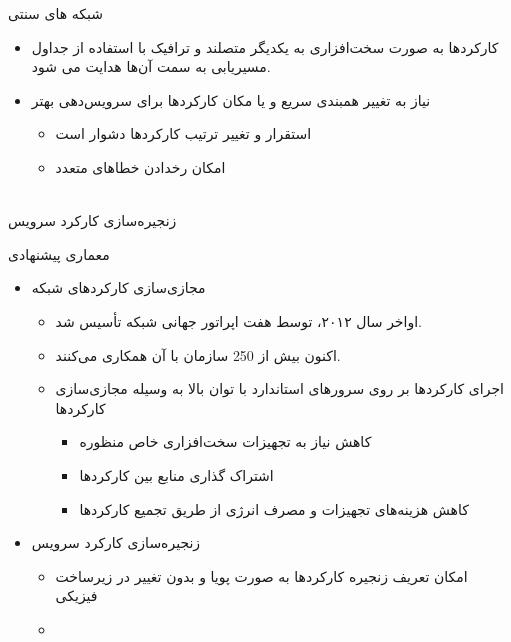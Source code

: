\documentclass{beamer}
\makeatletter
\newcommand{\RTList}{\raggedleft\rightskip\@totalleftmargin}
\makeatother
\begin{document}
\begin{persian}
\begin{frame}{شبکه های سنتی}
\begin{itemize}
        \item کارکردها به صورت سخت‌افزاری به یکدیگر متصلند و ترافیک با استفاده از جداول مسیریابی به سمت آن‌ها هدایت می شود.
        \item نیاز به تغییر همبندی سریع و یا مکان کارکردها برای سرویس‌دهی بهتر 
        \begin{itemize}\RTList{}
            \item استقرار و تغییر ترتیب کارکردها دشوار است
            \item امکان رخدادن خطاهای متعدد
        \end{itemize}
    \end{itemize}
    \begin{block}{}
        \centering
        \\
        زنجیره‌سازی کارکرد سرویس
    \end{block}
\end{frame}
\begin{frame}{معماری پیشنهادی}
    \begin{itemize}\RTList{}
        \justifying
        \item مجازی‌سازی کارکردهای شبکه 
        \begin{itemize}\RTList{}
            \item اواخر سال ۲۰۱۲،  توسط هفت اپراتور جهانی شبکه تأسیس شد.
            \item اکنون بیش از 250 سازمان با آن همکاری می‌کنند.
            \item اجرای کارکردها بر روی سرورهای استاندارد با توان بالا به وسیله مجازی‌سازی کارکردها
            \begin{itemize}\RTList{}
                \item کاهش نیاز به تجهیزات سخت‌افزاری خاص منظوره
                \item اشتراک گذاری منابع بین کارکرد‌ها
                \item کاهش هزینه‌های تجهیزات و مصرف انرژی از طریق تجمیع کارکردها
            \end{itemize}
        \end{itemize}
        \item زنجیره‌سازی کارکرد سرویس
        \begin{itemize}\RTList{}
            \item امکان تعریف زنجیره کارکردها به صورت پویا و بدون تغییر در زیرساخت فیزیکی
            \item {}

\end{itemize}
\end{itemize}
\end{frame}
\end{persian}
\end{document}
